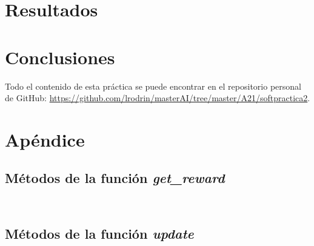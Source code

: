 \documentclass[11pt]{exam}
\begin{document}
\section{Resultados}\label{resultados}

\section{Conclusiones}\label{conclusiones}

Todo el contenido de esta práctica se puede encontrar en el repositorio personal de GitHub: \url{https://github.com/lrodrin/masterAI/tree/master/A21/softpractica2}.

\section{Apéndice}\label{apendice}

\subsection{Métodos de la función \textit{get\_reward}}\label{apendice_reward}

\begin{lstlisting}[language=python, basicstyle=\footnotesize]
	
\end{lstlisting}

\subsection{Métodos de la función \textit{update}}\label{apendice_update}

\begin{lstlisting}[language=python, basicstyle=\footnotesize]
	
\end{lstlisting}
\end{document}
